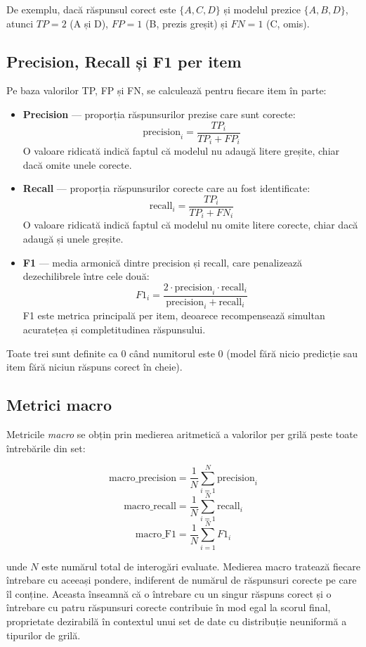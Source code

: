 \documentclass[12pt, a4paper, oneside, romanian]{teza-upb}
\begin{document}
De exemplu, dacă răspunsul corect este $\{A, C, D\}$ și modelul prezice $\{A, B, D\}$, atunci $TP = 2$ (A și D), $FP = 1$ (B, prezis greșit) și $FN = 1$ (C, omis).

\subsection{Precision, Recall și F1 per item}

Pe baza valorilor TP, FP și FN, se calculează pentru fiecare item în parte:

\begin{itemize}
    \item \textbf{Precision} --- proporția răspunsurilor prezise care sunt corecte:
    \[ \text{precision}_i = \frac{TP_i}{TP_i + FP_i} \]
    O valoare ridicată indică faptul că modelul nu adaugă litere greșite, chiar dacă omite unele corecte.

    \item \textbf{Recall} --- proporția răspunsurilor corecte care au fost identificate:
    \[ \text{recall}_i = \frac{TP_i}{TP_i + FN_i} \]
    O valoare ridicată indică faptul că modelul nu omite litere corecte, chiar dacă adaugă și unele greșite.

    \item \textbf{F1} --- media armonică dintre precision și recall, care penalizează dezechilibrele între cele două:
    \[ F1_i = \frac{2 \cdot \text{precision}_i \cdot \text{recall}_i}{\text{precision}_i + \text{recall}_i} \]
    F1 este metrica principală per item, deoarece recompensează simultan acuratețea și completitudinea răspunsului.
\end{itemize}

Toate trei sunt definite ca $0$ când numitorul este $0$ (model fără nicio predicție sau item fără niciun răspuns corect în cheie).

\subsection{Metrici macro}

Metricile \textit{macro} se obțin prin medierea aritmetică a valorilor per grilă peste toate întrebările din set:

\[ \text{macro\_precision} = \frac{1}{N} \sum_{i=1}^{N} \text{precision}_i \]
\[ \text{macro\_recall} = \frac{1}{N} \sum_{i=1}^{N} \text{recall}_i \]
\[ \text{macro\_F1} = \frac{1}{N} \sum_{i=1}^{N} F1_i \]

unde $N$ este numărul total de interogări evaluate. Medierea macro tratează fiecare întrebare cu aceeași pondere, indiferent de numărul de răspunsuri corecte pe care îl conține. Aceasta înseamnă că o întrebare cu un singur răspuns corect și o întrebare cu patru răspunsuri corecte contribuie în mod egal la scorul final,  proprietate dezirabilă în contextul unui set de date cu distribuție neuniformă a tipurilor de grilă.
\end{document}
